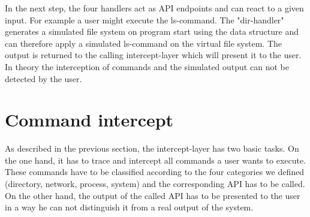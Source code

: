 In the next step, the four handlers act as API endpoints and can react to a given input. For example a user might execute the ls-command. The "dir-handler" generates a simulated file system on program start using the data structure and can therefore apply a simulated ls-command on the virtual file system. The output is returned to the calling intercept-layer which will present it to the user. In theory the interception of commands and the simulated output can not be detected by the user.

\section{Command intercept}
As described in the previous section, the intercept-layer has two basic tasks. On the one hand, it has to trace and intercept all commands a user wants to execute. These commands have to be classified according to the four categories we defined (directory, network, process, system) and the corresponding API has to be called. On the other hand, the output of the called API has to be presented to the user in a way he can not distinguish it from a real output of the system.

